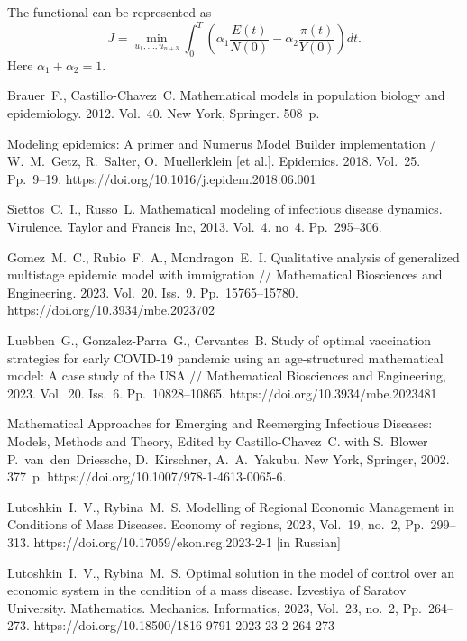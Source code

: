 \documentclass[12pt]{llncs}
\begin{document}
The functional can be represented as
$$J=\min_{u_1,...,u_{n+3}}\int_{0}^{T}\left(\alpha_1\frac{E(t)}{N(0)}-\alpha_2\frac{\pi(t)}{Y(0)}\right)dt.$$
Here $\alpha_1+\alpha_2=1$.


\begin{thebibliography}{9} %

 Brauer~F., Castillo-Chavez~C. Mathematical models in population biology and epidemiology. 2012. Vol.~40. New York, Springer. 508~p.

 Modeling epidemics: A primer and Numerus Model Builder implementation / W.~M.~Getz, R.~Salter, O.~Muellerklein [et al.].  Epidemics. 2018.  Vol.~25.  Pp.~9--19. https://doi.org/10.1016/j.epidem.2018.06.001

 Siettos~C.~I., Russo~L. Mathematical modeling of infectious disease dynamics. Virulence. Taylor and Francis Inc, 2013.  Vol.~4. no~4. Pp.~295--306.

 Gomez~M.~C., Rubio~F.~A., Mondragon~E.~I. Qualitative analysis of generalized multistage epidemic model with immigration // Mathematical Biosciences and Engineering. 2023. Vol.~20. Iss.~9. Pp.~15765--15780.  https://doi.org/10.3934/mbe.2023702

 Luebben~G., Gonzalez-Parra~G.,  Cervantes~B. Study of optimal vaccination strategies for early COVID-19 pandemic using an age-structured mathematical model:  A case study of the USA // Mathematical Biosciences and Engineering, 2023. Vol.~20. Iss.~6. Pp.~10828--10865.  https://doi.org/10.3934/mbe.2023481

 Mathematical Approaches for Emerging and Reemerging Infectious Diseases: Models, Methods and Theory, Edited by Castillo-Chavez~C. with S.~Blower P.~van~den~Driessche, D.~Kirschner, A.~A.~Yakubu. New York, Springer, 2002. 377~p. https://doi.org/10.1007/978-1-4613-0065-6.

 Lutoshkin~I.~V., Rybina~M.~S. Modelling of Regional Economic Management in Conditions of Mass Diseases.  Economy of regions, 2023, Vol.~19, no.~2, Pp.~299--313. https://doi.org/10.17059/ekon.reg.2023-2-1 [in Russian]

 Lutoshkin~I.~V., Rybina~M.~S. Optimal solution in the model of control over an economic system in the condition of a mass disease. Izvestiya of Saratov University.  Mathematics. Mechanics. Informatics, 2023, Vol.~23, no.~2, Pp.~264--273. https://doi.org/10.18500/1816-9791-2023-23-2-264-273

\end{thebibliography}
\end{document}
